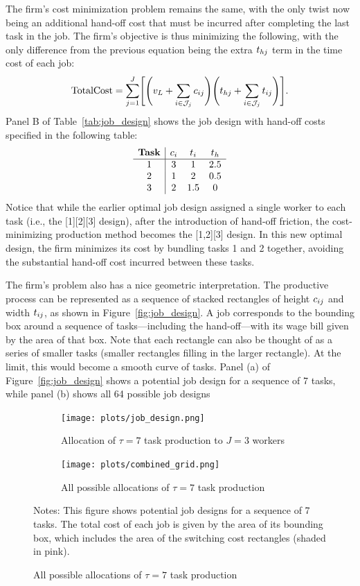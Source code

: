 \documentclass{article}
\theoremstyle{plain}
\theoremstyle{plain}
\begin{document}
The firm's cost minimization problem remains the same, with the only twist now being an additional hand-off cost that must be incurred after completing the last task in the job. 
The firm's objective is thus minimizing the following, with the only difference from the previous equation being the extra $t_{hj}$ term in the time cost of each job:
\[
\text{TotalCost} = \sum_{j=1}^J \Biggl[\Biggl(v_L + \sum_{i \in \mathcal{J}_j} c_{ij} \Biggr) \Biggl(t_{hj} + \sum_{i \in \mathcal{J}_j} t_{ij} \Biggr)\Biggr].
\]
Panel B of Table~\ref{tab:job_design} shows the job design with hand-off costs specified in the following table:
\[
\begin{array}{c|ccc}
\textbf{Task} & c_{i} & t_{i} & t_{h} \\ \hline
1 & 3  & 1   & 2.5 \\
2 & 1 & 2   & 0.5 \\
3 & 2   & 1.5 & 0 \\
\end{array}
\]
Notice that while the earlier optimal job design assigned a single worker to each task (i.e., the [1][2][3] design), after the introduction of hand-off friction, the cost-minimizing production method becomes the [1,2][3] design.  
In this new optimal design, the firm minimizes its cost by bundling tasks 1 and 2 together, avoiding the substantial hand-off cost incurred between these tasks.

The firm's problem also has a nice geometric interpretation.
The productive process can be represented as a sequence of stacked rectangles of height $c_{ij}$ and width $t_{ij}$, as shown in Figure~\ref{fig:job_design}.
A job corresponds to the bounding box around a sequence of tasks---including the hand-off---with its wage bill given by the area of that box.
Note that each rectangle can also be thought of as a series of smaller tasks (smaller rectangles filling in the larger rectangle).
At the limit, this would become a smooth curve of tasks.
Panel (a) of Figure~\ref{fig:job_design} shows a potential job design for a sequence of 7 tasks, while panel (b) shows all 64 possible job designs
\begin{figure}[htbp]
  \begin{center}
  \caption{Example allocations of workers to tasks when $\tau = 7$} \label{fig:job_design}
  \begin{subfigure}[b]{0.48\textwidth}
    \texttt{[image: plots/job\_design.png]}
    \caption{Allocation of $\tau=7$ task production to $J = 3$ workers}
  \end{subfigure}
  \hfill
  \begin{subfigure}[b]{0.48\textwidth}
    \texttt{[image: plots/combined\_grid.png]}
    \caption{All possible allocations of $\tau=7$ task production}
  \end{subfigure}
  \end{center}
  \footnotesize{Notes: This figure shows potential job designs for a sequence of 7 tasks.
  The total cost of each job is given by the area of its bounding box, which includes the area of the switching cost rectangles (shaded in pink).
  }
\end{figure}
\end{document}
